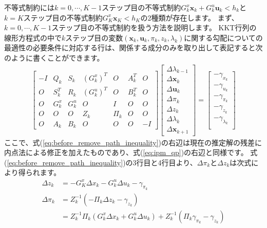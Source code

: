 \documentclass[a4paper]{jarticle}
\begin{document}
不等式制約には$k=0,\cdots,K-1$ステップ目の不等式制約$G_k^x\mathbf{x}_k + G_k^u\mathbf{u}_k<h_k$と$k=K$ステップ目の不等式制約$G_K^x\mathbf{x}_K<h_K$の2種類が存在します。
まず、$k=0,\cdots,K-1$ステップ目の不等式制約を扱う方法を説明します。
KKT行列の線形方程式の中で$k$ステップ目の変数$(\mathbf{x}_k,\mathbf{u}_k,\pi_k,z_k,\lambda_k)$に関する勾配についての最適性の必要条件に対応する行は、関係する成分のみを取り出して表記すると次のように書くことができます。
\begin{align}
\begin{bmatrix}
 -I &  Q_{k} & S_{k} & (G_{k}^x)^T & O & A_{k}^T & O \\
 O &  S_{k}^T & R_{k} & (G_{k}^u)^T & O & B_{k}^T & O \\
 O  & G_{k}^x      & G_{k}^u & O  & I &  O & O\\
O  & O       & O       & Z_{k} & \Pi_{k}   &  O & O\\
O  & A_{k} & B_{k} & O & O   &  O & -I
\end{bmatrix}
\begin{bmatrix}
\Delta \lambda_{k-1}\\
\Delta \mathbf{x}_{k}\\
\Delta \mathbf{u}_{k}\\
\Delta \pi_{k}\\
\Delta z_{k}\\
\Delta \lambda_{k}\\
\Delta \mathbf{x}_{k+1}
\end{bmatrix}
=
\begin{bmatrix}
-\gamma_{x_k}\\
-\gamma_{u_k}\\
-\gamma_{\pi_k}\\
-\gamma_{z_k}\\
-\gamma_{\lambda_k}\\
\end{bmatrix}
\label{eq:before_remove_path_inequality}
\end{align}
ここで、式(\ref{eq:before_remove_path_inequality})の右辺は現在の推定解の残差に内点法による修正を加えたものであり、式(\ref{eq:ipm_qp})の右辺と同様です。
式(\ref{eq:before_remove_path_inequality})の3行目と4行目より、$\Delta \pi_k$と$\Delta z_k$は次式により得られます。
\begin{align*}
\Delta z_k &= -G_K^x\Delta x_k-G_k^u\Delta u_k-\gamma_{\pi_k}
\\
\Delta \pi_k &= Z_k^{-1}(-\Pi_k\Delta z_k -\gamma_{z_k})
\\
&= Z_k^{-1}\Pi_k(G_k^x\Delta x_k + G_k^u\Delta u_k)
+Z_k^{-1}(\Pi_k\gamma_{\pi_k}-\gamma_{z_k})
\end{align*}
\end{document}
